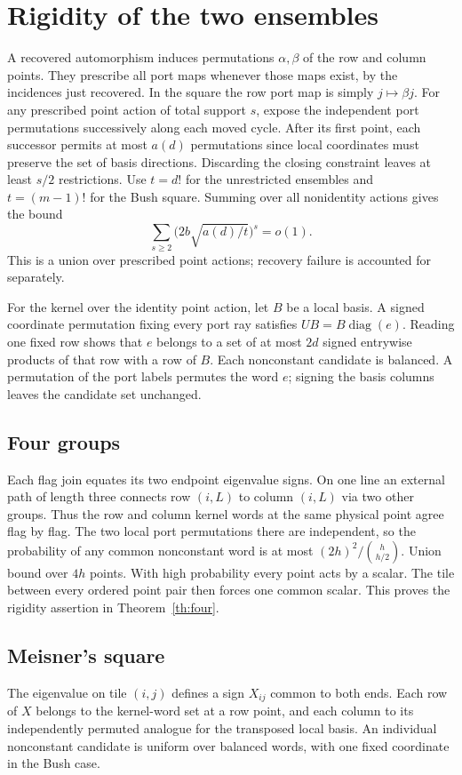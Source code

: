 \documentclass[11pt,reqno]{amsart}
\theoremstyle{remark}\newtheorem{remark}[theorem]{Remark}
\begin{document}
\section{Rigidity of the two ensembles}\label{sec:rigid}
A recovered automorphism induces permutations \(\alpha,\beta\) of the row and column points. They prescribe all port maps whenever those maps exist, by the incidences just recovered. In the square the row port map is simply \(j\mapsto\beta j\). For any prescribed point action of total support \(s\), expose the independent port permutations successively along each moved cycle. After its first point, each successor permits at most \(a(d)\) permutations since local coordinates must preserve the set of basis directions. Discarding the closing constraint leaves at least \(s/2\) restrictions. Use \(t=d!\) for the unrestricted ensembles and \(t=(m-1)!\) for the Bush square. Summing over all nonidentity actions gives the bound
\[
 \sum_{s\ge2}\bigl(2b\sqrt{a(d)/t}\bigr)^s=o(1).
\]
This is a union over prescribed point actions; recovery failure is accounted for separately.

For the kernel over the identity point action, let \(B\) be a local basis. A signed coordinate permutation fixing every port ray satisfies \(UB=B\operatorname{diag}(e)\). Reading one fixed row shows that \(e\) belongs to a set of at most \(2d\) signed entrywise products of that row with a row of \(B\). Each nonconstant candidate is balanced. A permutation of the port labels permutes the word \(e\); signing the basis columns leaves the candidate set unchanged.

\subsection{Four groups}
Each flag join equates its two endpoint eigenvalue signs. On one line an external path of length three connects row \((i,L)\) to column \((i,L)\) via two other groups. Thus the row and column kernel words at the same physical point agree flag by flag. The two local port permutations there are independent, so the probability of any common nonconstant word is at most \((2h)^2/\binom{h}{h/2}\). Union bound over \(4h\) points. With high probability every point acts by a scalar. The tile between every ordered point pair then forces one common scalar. This proves the rigidity assertion in Theorem~\ref{th:four}.

\subsection{Meisner's square}
The eigenvalue on tile \((i,j)\) defines a sign \(X_{ij}\) common to both ends. Each row of \(X\) belongs to the kernel-word set at a row point, and each column to its independently permuted analogue for the transposed local basis. An individual nonconstant candidate is uniform over balanced words, with one fixed coordinate in the Bush case.
\end{document}

